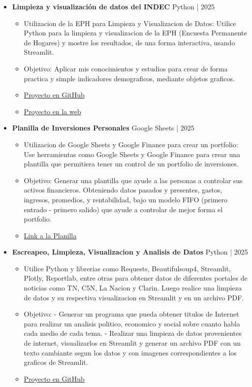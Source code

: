 \documentclass[11pt, a4paper]{article}
\newcommand{\cvitem}[2]{\textbf{#1} \hfill \color{secondary}#2} %
\begin{document}
\begin{itemize}[leftmargin=*]
    \item \cvitem{Limpieza y visualización de datos del INDEC}{Python | 2025}
    \begin{itemize}
        \item Utilizacion de la EPH para Limpieza y Visualizacion de Datos: Utilice Python para la limpieza y visualizacion de la EPH (Encuesta Permanente de Hogares) y mostre los resultados, de una forma interactiva, usando Streamlit.
        \item Objetivo: Aplicar mis conocimientos y estudios para crear de forma practica y simple indicadores demograficos, mediante objetos graficos.
        \item \href{https://github.com/JoacoLucen/EPH-Insight-App}{Proyecto en GitHub}
        \item \href{https://eph-insight-app-joacolucentini.streamlit.app/}{Proyecto en la web}
    \end{itemize}
    \item \cvitem{Planilla de Inversiones Personales}{Google Sheets | 2025}
    \begin{itemize}
        \item Utilizacion de Google Sheets y Google Finance para crear un portfolio: Use herramientas como Google Sheets y Google Finance para crear una plantilla que permitiera tener un control de un portfolio de inversiones.
        \item Objetivo: Generar una plantilla que ayude a las personas a controlar sus activos financieros. Obteniendo datos pasados y presentes, gastos, ingresos, promedios, y rentabilidad, bajo un modelo FIFO (primero entrado - primero salido) que ayude a controlar de mejor forma el portfolio.
        \item \href{https://docs.google.com/spreadsheets/d/1MOAbafLv-NISA2nb2gy0AmwRGHegZyXV7TNal1StVgE/edit?usp=sharing}{Link a la Planilla}
    \end{itemize}
    \cvitem { }
    \item \cvitem{Escreapeo, Limpieza, Visualizacion y Analisis de Datos}{Python | 2025}
    \begin{itemize}
        \item Utilice Python y librerias como Requests, Beautifulsoup4, Streamlit, Plotly, Reportlab, entre otras para obtener datos de diferentes portales de noticias como TN, C5N, La Nacion y Clarin. Luego realice una limpieza de datos y su respectiva visualizacion en Streamlit y en un archivo PDF.
        \item Objetivo: 
        - Generar un programa que pueda obtener titulos de Internet para realizar un analisis politico, economico y social sobre cuanto habla cada medio de cada tema.
        - Realizar una limpieza de datos provenientes de internet, visualizarlos en Streamlit y generar un archivo PDF con un texto cambiante segun los datos y con imagenes correspondientes a los graficos de Streamlit.
        \item \href{https://github.com/JoacoLucen/scraping_web}{Proyecto en GitHub}
    \end{itemize}
\end{itemize}
\end{document}
